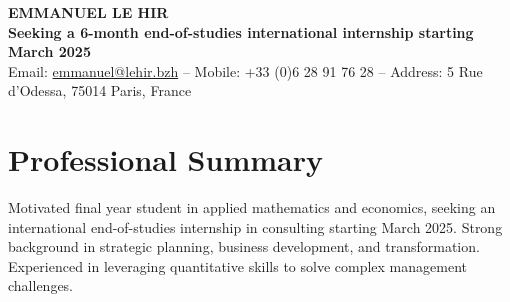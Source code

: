 \documentclass[a4paper,9pt]{extarticle}
\begin{document}
\pagestyle{empty}

\begin{center}
\vspace*{-15pt}
\textbf{\LARGE EMMANUEL LE HIR}\\
\vspace{5pt}
\textbf{Seeking a 6-month end-of-studies international internship starting March 2025} \\
\vspace{3pt}
Email: \href{mailto:emmanuel@lehir.bzh}{emmanuel@lehir.bzh} -- Mobile: +33 (0)6 28 91 76 28 -- Address: 5 Rue d'Odessa, 75014 Paris, France
\end{center}


\section*{\faUser \hspace{0.1em} Professional Summary}
Motivated final year student in applied mathematics and economics, seeking an international end-of-studies internship in consulting starting March 2025. Strong background in strategic planning, business development, and transformation. Experienced in leveraging quantitative skills to solve complex management challenges.

\vspace{6pt}

\end{document}
